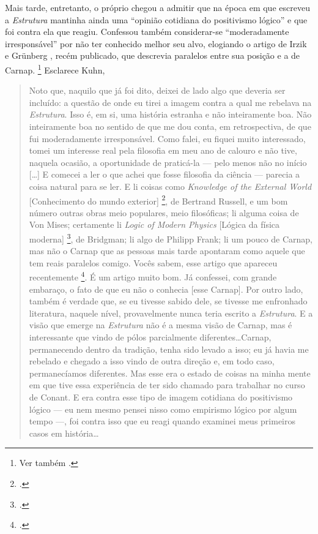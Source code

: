 Mais tarde, entretanto, o próprio \citet[p. 368]{KUHN2006} chegou a admitir que na época em que escreveu a \emph{Estrutura} mantinha ainda uma ``opinião cotidiana do positivismo lógico'' e que foi contra ela que reagiu. Confessou também considerar-se ``moderadamente irresponsável'' por não ter conhecido melhor seu alvo, elogiando o artigo de Irzik e Grünberg \citeyearpar{IRZIK1995}, recém publicado, que descrevia paralelos entre sua posição e a de Carnap.%
	 \footnote{Ver também \citet[p. 359]{RICHARDSON2007b}.} Esclarece Kuhn, 

\begin{quote}

        Noto que, naquilo que já foi dito, deixei de lado algo que deveria ser incluído: a questão de onde eu tirei a imagem contra a qual me rebelava na \emph{Estrutura}. Isso é, em si, uma história estranha e não inteiramente boa. Não inteiramente boa no sentido de que me dou conta, em retrospectiva, de que fui moderadamente irresponsável. Como falei, eu fiquei muito interessado, tomei um interesse real pela filosofia em meu ano de calouro e não tive, naquela ocasião, a oportunidade de praticá-la --- pelo menos não no início [\ldots] E comecei a ler o que achei que fosse filosofia da ciência --- parecia a coisa natural para se ler. E li coisas como \emph{Knowledge of the External World} [Conhecimento do mundo exterior]%
	 \footnote{\citet{RUSSELL1914}.}, de Bertrand Russell, e um bom número outras obras meio populares, meio filosóficas; li alguma coisa de Von Mises; certamente li \emph{Logic of Modern Physics} [Lógica da física moderna]%
	 \footnote{\citet{BRIDGMAN1927}.}, de Bridgman; li algo de Philipp Frank; li um pouco de Carnap, mas não o Carnap que as pessoas mais tarde apontaram como aquele que tem reais paralelos comigo. Vocês sabem, esse artigo que apareceu recentemente%
	 \footnote{\citet{IRZIK1995}.}. É um artigo muito bom. Já confessei, com grande embaraço, o fato de que eu não o conhecia [esse Carnap]. Por outro lado, também é verdade que, se eu tivesse sabido dele, se tivesse me enfronhado literatura, naquele nível, provavelmente nunca teria escrito a \emph{Estrutura}. E a visão que emerge na \emph{Estrutura} não é a mesma visão de Carnap, mas é interessante que vindo de pólos parcialmente diferentes\ldots Carnap, permanecendo dentro da tradição, tenha sido levado a isso; eu já havia me rebelado e chegado a isso vindo de outra direção e, em todo caso, permanecíamos diferentes. Mas esse era o estado de coisas na minha mente em que tive essa experiência de ter sido chamado para trabalhar no curso de Conant. E era contra esse tipo de imagem cotidiana do positivismo lógico --- eu nem mesmo pensei nisso como empirismo lógico por algum tempo ---, foi contra isso que eu reagi quando examinei meus primeiros casos em história\ldots ~\citep[pp. 367--368]{KUHN2006}%

\end{quote}
